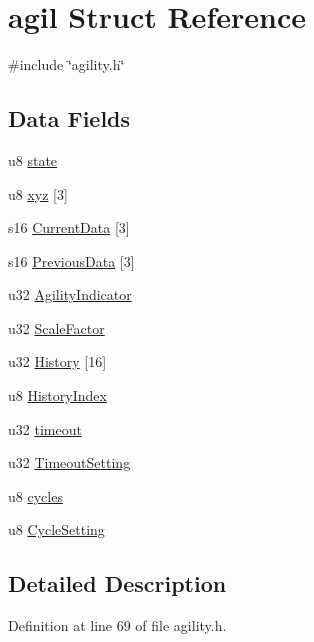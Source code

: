 \hypertarget{structagil}{\section{agil \-Struct \-Reference}
\label{structagil}
}


{\ttfamily \#include \char`\"{}agility.\-h\char`\"{}}

\subsection*{\-Data \-Fields}
\begin{DoxyCompactItemize}
\item 
u8 \hyperlink{structagil_ad0bc4e4e6e6ffc52d9079b73afd73887}{state}
\item 
u8 \hyperlink{structagil_af9cba48daaf1e24eb2df884547c0efcc}{xyz} \mbox{[}3\mbox{]}
\item 
s16 \hyperlink{structagil_ac11c5137c1e21f67a03b39f8d0325bc1}{\-Current\-Data} \mbox{[}3\mbox{]}
\item 
s16 \hyperlink{structagil_abc2f303afac26d1a0b0c98c58f92c822}{\-Previous\-Data} \mbox{[}3\mbox{]}
\item 
u32 \hyperlink{structagil_aca4918ae56fe21d73cc4b85d5ce1d3af}{\-Agility\-Indicator}
\item 
u32 \hyperlink{structagil_ac6c1d7ef12dbf33efe5a86a37e75caf4}{\-Scale\-Factor}
\item 
u32 \hyperlink{structagil_a9bbc4071e3512d3bbc55e6080ab105bb}{\-History} \mbox{[}16\mbox{]}
\item 
u8 \hyperlink{structagil_a3b8a7ebc318db1dd3ccdfe5aae95a7d0}{\-History\-Index}
\item 
u32 \hyperlink{structagil_aab0b8a4320e771becf663b000c2cd7e1}{timeout}
\item 
u32 \hyperlink{structagil_a20960b675c12b40c0761d99bd95661c8}{\-Timeout\-Setting}
\item 
u8 \hyperlink{structagil_a9fb4c5ef5c7048e3974f3fa10ed4595c}{cycles}
\item 
u8 \hyperlink{structagil_a215f5f3e0ef8079a4197952e909fe0e7}{\-Cycle\-Setting}
\end{DoxyCompactItemize}


\subsection{\-Detailed \-Description}


\-Definition at line 69 of file agility.\-h.



